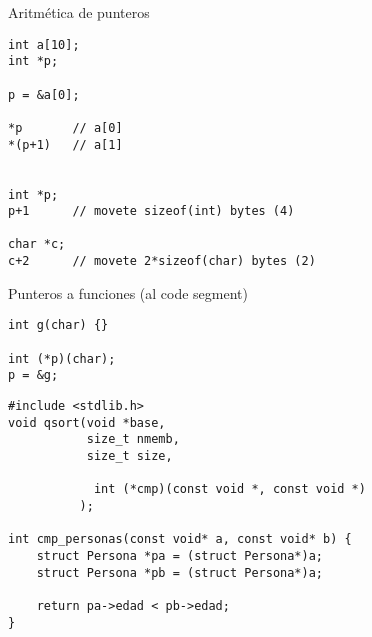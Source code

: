 \begin{frame}[fragile]{Aritm\'etica de punteros}
         \begin{lstlisting}[style=normal]
int a[10];
int *p;

p = &a[0];

*p       // a[0]
*(p+1)   // a[1]


int *p;
p+1      // movete sizeof(int) bytes (4)

char *c;
c+2      // movete 2*sizeof(char) bytes (2)

         \end{lstlisting}
\end{frame}

\begin{frame}[fragile]{Punteros a funciones (al code segment)}
         \begin{lstlisting}[style=normal]
int g(char) {}

int (*p)(char);
p = &g;
         \end{lstlisting}
\pause
         \begin{lstlisting}[style=normal]
#include <stdlib.h>
void qsort(void *base, 
           size_t nmemb, 
           size_t size,
                   
            int (*cmp)(const void *, const void *)
          );

int cmp_personas(const void* a, const void* b) {
    struct Persona *pa = (struct Persona*)a;
    struct Persona *pb = (struct Persona*)a;

    return pa->edad < pb->edad;
}

         \end{lstlisting}
\end{frame}


